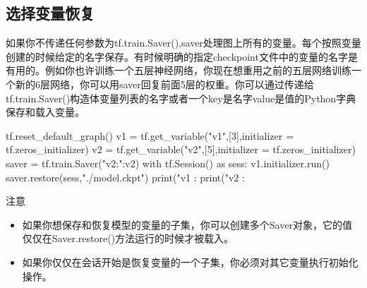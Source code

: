 \subsection{选择变量恢复}
如果你不传递任何参数为tf.train.Saver(),saver处理图上所有的变量。每个按照变量创建的时候给定的名字保存。有时候明确的指定checkpoint文件中的变量的名字是有用的。例如你也许训练一个五层神经网络，你现在想重用之前的五层网络训练一个新的6层网络，你可以用saver回复前面5层的权重。你可以通过传递给tf.train.Saver()构造体变量列表的名字或者一个key是名字value是值的Python字典保存和载入变量。
\begin{python}
tf.reset_default_graph()
	v1 = tf.get_variable("v1",[3],initializer = tf.zeros_initializer)
	v2 = tf.get_variable("v2",[5],initializer = tf.zeros_initializer)
	saver = tf.train.Saver({"v2:":v2})
	with tf.Session() as sess:
	    v1.initializer.run()
	    saver.restore(sess,"./model.ckpt")
	    print("v1 : %
	    print("v2 : %
\end{python}
注意
\begin{itemize}
	\item 如果你想保存和恢复模型的变量的子集，你可以创建多个Saver对象，它的值仅仅在Saver.restore()方法运行的时候才被载入。
	\item 如果你仅仅在会话开始是恢复变量的一个子集，你必须对其它变量执行初始化操作。
\end{itemize}
